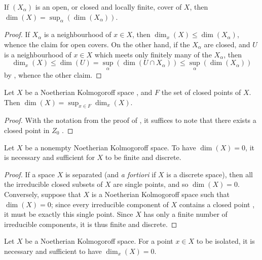 \begin{corollary}[14.1.7]
\label{0.14.1.7}
If $(X_\alpha)$ is an open, or closed and locally finite, cover of $X$, then $\dim(X)=\sup_\alpha(\dim(X_\alpha))$.
\end{corollary}

\begin{proof}
\label{proof-0.14.1.7}
If $X_\alpha$ is a neighbourhood of $x\in X$, then $\dim_x(X)\leq\dim(X_\alpha)$, whence the claim for open covers.
On the other hand, if the $X_\alpha$ are closed, and $U$ is a neighbourhood of $x\in X$ which meets only finitely many of the $X_\alpha$, then
\[
  \dim_x(X)\leq\dim(U)=\sup_\alpha(\dim(U\cap X_\alpha))\leq\sup_\alpha(\dim(X_\alpha))
\]
by , whence the other claim.
\end{proof}

\begin{corollary}[14.1.8]
\label{0.14.1.8}
Let $X$ be a Noetherian Kolmogoroff space , and $F$ the set of closed points of $X$.
Then $\dim(X)=\sup_{x\in F}\dim_x(X)$.
\end{corollary}

\begin{proof}
\label{proof-0.14.1.8}
With the notation from the proof of , it suffices to note that there exists a closed point in $Z_0$ .
\end{proof}

\begin{proposition}[14.1.9]
\label{0.14.1.9}
Let $X$ be a nonempty Noetherian Kolmogoroff space.
To have $\dim(X)=0$, it is necessary and sufficient for $X$ to be finite and discrete.
\end{proposition}

\begin{proof}
\label{proof-0.14.1.9}
If a space $X$ is separated (and \emph{a fortiori} if $X$ is a discrete space), then all the irreducible closed subsets of $X$ are single points, and so $\dim(X)=0$.
Conversely, suppose that $X$ is a Noetherian Kolmogoroff space such that $\dim(X)=0$;
since every irreducible component of $X$ contains a closed point , it must be exactly this single point.
Since $X$ has only a finite number of irreducible components, it is thus finite and discrete.
\end{proof}

\begin{corollary}[14.1.10]
\label{0.14.1.10}
Let $X$ be a Noetherian Kolmogoroff space.
For a point $x\in X$ to be isolated, it is necessary and sufficient to have $\dim_x(X)=0$.
\end{corollary}

